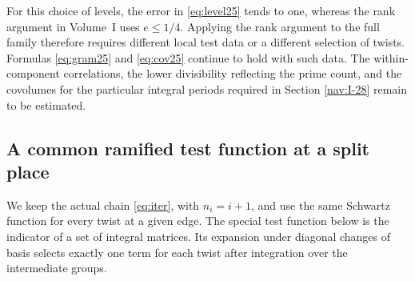 \documentclass[a4paper,11pt]{article}
\theoremstyle{definition}
\theoremstyle{remark}
\numberwithin{equation}{section}
\begin{document}
For this choice of levels, the error in \eqref{eq:level25} tends to one, whereas the rank argument in Volume~I uses \(e\le1/4\). Applying the rank argument to the full family therefore requires different local test data or a different selection of twists. Formulas \eqref{eq:gram25} and \eqref{eq:cov25} continue to hold with such data. The within-component correlations, the lower divisibility reflecting the prime count, and the covolumes for the particular integral periods required in Section \ref{nav:I-28} remain to be estimated.

\subsection{A common ramified test function at a split place}\label{nav:I-45}
\label{sec:flag29}

We keep the actual chain \eqref{eq:iter}, with \(n_i=i+1\), and use the same Schwartz function for every twist at a given edge. The special test function below is the indicator of a set of integral matrices. Its expansion under diagonal changes of basis selects exactly one term for each twist after integration over the intermediate groups.
\end{document}
